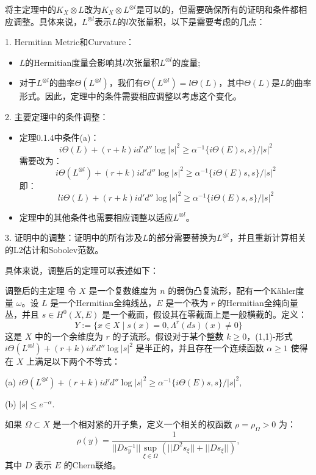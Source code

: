 \documentclass[lang=cn,12pt,fontset=none,a4paper]{beautybook}
\begin{document}
将主定理中的$K_X\otimes L$改为$K_X\otimes L^{\otimes l}$是可以的，但需要确保所有的证明和条件都相应调整。具体来说，$L^{\otimes l}$表示$L$的$l$次张量积，以下是需要考虑的几点：

1. Hermitian Metric和Curvature：
\begin{itemize}
   \item $L$的Hermitian度量会影响其$l$次张量积$L^{\otimes l}$的度量;
   \item 对于$L^{\otimes l}$的曲率$\Theta(L^{\otimes l})$，我们有$\Theta(L^{\otimes l}) = l\Theta(L)$，其中$\Theta(L)$是$L$的曲率形式。因此，定理中的条件需要相应调整以考虑这个变化。
\end{itemize}

2. 主要定理中的条件调整：
\begin{itemize}
      \item 定理0.1.4中条件(a)：
        $$ i\Theta(L) + (r + k) id'd'' \log |s|^2 \geq α^{-1} \{i\Theta(E)s, s\}/|s|^2 $$
        需要改为：
        $$ i\Theta(L^{\otimes l}) + (r + k) id'd'' \log |s|^2 \geq α^{-1} \{i\Theta(E)s, s\}/|s|^2 $$
        即：
        $$ li\Theta(L) + (r + k) id'd'' \log |s|^2 \geq α^{-1} \{i\Theta(E)s, s\}/|s|^2 $$
      \item 定理中的其他条件也需要相应调整以适应$L^{\otimes l}$。
\end{itemize}
   

3. 证明中的调整：证明中的所有涉及$L$的部分需要替换为$L^{\otimes l}$，并且重新计算相关的L2估计和Sobolev范数。

具体来说，调整后的定理可以表述如下：

调整后的主定理
令 $X$ 是一个复数维度为 $n$ 的弱伪凸复流形，配有一个Kähler度量 $\omega$。设 $L$ 是一个Hermitian全纯线丛，$E$ 是一个秩为 $r$ 的Hermitian全纯向量丛，并且 $s \in H^0(X, E)$ 是一个截面，假设其在零截面上是一般横截的。定义：
$$ Y := \{x \in X \mid s(x) = 0, \Lambda^r(ds)(x) \neq 0\} $$
这是 $X$ 中的一个余维度为 $r$ 的子流形。假设对于某个整数 $k \geq 0$，(1,1)-形式 $i\Theta(L^{\otimes l}) + (r+k) id'd'' \log |s|^2$ 是半正的，并且存在一个连续函数 $α \geq 1$ 使得在 $X$ 上满足以下两个不等式：

(a) \(i\Theta(L^{\otimes l}) + (r+k) id'd'' \log |s|^2 \geq α^{-1} \{i\Theta(E)s, s\}/|s|^2\),

(b) \(|s| \leq e^{-α}\).

如果 $\Omega \subset X$ 是一个相对紧的开子集，定义一个相关的权函数 \(\rho = \rho_\Omega > 0\) 为：
$$ \rho(y) = \frac{1}{||D s^{-1}_y|| \sup_{\xi \in \Omega} (||D^2 s_\xi|| + ||D s_\xi||)}, $$
其中 $D$ 表示 $E$ 的Chern联络。
\end{document}
